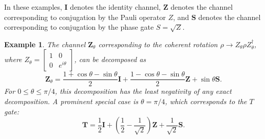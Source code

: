 \documentclass[twocolumn,pra]{revtex4}
\newtheorem{example}{Example}
\begin{document}
In these examples, $\mathbf{I}$ denotes the identity channel, $\mathbf{Z}$ denotes the channel corresponding to conjugation by the Pauli operator $Z$, and $\mathbf{S}$ denotes the channel corresponding to conjugation by the phase gate $S = \sqrt{Z}$. 
\par
\begin{example}
The channel $\mathbf{Z}_\theta$ corresponding to the coherent rotation $\rho\rightarrow Z_\theta\rho Z_\theta^{\dagger}$,
where $Z_\theta=\left[\begin{array}{cc}
1 & 0\\
0 & e^{i\theta}
\end{array}\right]$, can be decomposed as
\begin{equation}
 \mathbf{Z}_\theta  =\frac{1+\cos\theta-\sin\theta}{2}\mathbf{I}+\frac{1-\cos\theta-\sin\theta}{2}\mathbf{Z}+\sin\theta\mathbf{S}.
\label{eqn:Z decomp2}
\end{equation}
For $0\le\theta\le\pi/4$, this decomposition has the least negativity of any exact decomposition. A prominent special case is $\theta=\pi/4$, which corresponds to the $T$ gate:
\begin{equation}\label{eq:T gate decomp}
\mathbf{T} = \frac{1}{2}\mathbf{I}+\left(\frac{1}{2}-\frac{1}{\sqrt{2}}\right)\mathbf{Z}+\frac{1}{\sqrt{2}}\mathbf{S}.
\end{equation}
\end{example}
\end{document}
